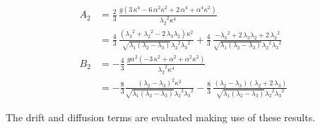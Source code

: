 \[
\begin{aligned}
 A_2&= \frac{2}{3}\,{\frac {g\left
    (3\,{\kappa}^4-6\,{\alpha}^2{\kappa}^2+2\,{
     \alpha}^4+{\alpha}^4{\kappa}^2\right
   )}{{\lambda_2}^2{\kappa}^4}}\\
 &= \frac{4}{3}\,{\frac {\left
    ({\lambda_3}^2+{\lambda_2}^2-2\,\lambda
    _3\lambda_2\right){\kappa}^2}{\sqrt
   {\lambda_1\left( \lambda_2-\lambda_3\right
    )}{\lambda_2}^2{\lambda_3}
   ^2}}+\frac{4}{3}\,{\frac
  {-{\lambda_3}^2+2\,\lambda_3\lambda_2
   +2\,{\lambda_2}^2}{\sqrt {\lambda_1\left
     (\lambda_2-
     \lambda_3\right)}{\lambda_2}^2{\lambda_3}^2}}\\
B_2 &=-\frac{4}{3}\,{\frac {g{\alpha}^2\left(-3\,{\kappa}^2+{\alpha}^2+{
\alpha}^2{\kappa}^2\right)}{{\lambda_2}^2{\kappa}^{4}}}\\
& = -\frac{8}{3} {\frac{\left(\lambda_2-\lambda_3\right)^2{\kappa}^{2}}{\sqrt{\lambda_1\left(\lambda_2-\lambda_3\right)}{\lambda_2}^2{\lambda_3}^2}}-\frac{8}{3}\,{\frac{\left(\lambda_2-\lambda_3\right)\left(\lambda_2+2\,\lambda_3\right)}{\sqrt{\lambda_1\left(\lambda_2-\lambda_3\right)}{\lambda_2}^2{\lambda_3}^2}}
\end{aligned}
\]

The drift and diffusion terms are evaluated making use of these
results.
